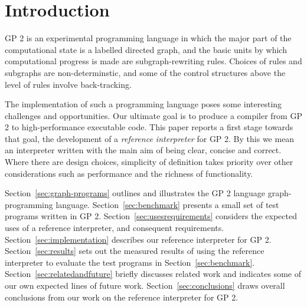 \section{Introduction}

GP 2 is an experimental programming language in which the major part of
the computational state is a labelled directed graph, and the basic
units by which computational progress is made are subgraph-rewriting
rules.
Choices of rules and subgraphs are non-determinstic, and some of
the control structures above the level of rules involve back-tracking.

The implementation of such a programming language poses some
interesting challenges and opportunities.
Our ultimate goal is to produce a compiler from GP 2 to
high-performance executable code.
This paper reports a first stage towards that goal, the development
of a \emph{reference interpreter} for GP 2.
By this we mean an interpreter written with the main aim of
being clear, concise and correct.
Where there are design choices, simplicity of
definition takes priority over other considerations
such as performance and the richness of functionality.

Section~\ref{sec:graph-programs} outlines and illustrates the GP 2 language
graph-programming language.
Section~\ref{sec:benchmark} presents a small set of test programs
written in GP 2.
Section~\ref{sec:usesrequirements} considers the expected uses of
a reference interpreter, and consequent requirements.
Section~\ref{sec:implementation} describes our reference interpreter for
GP 2.
Section~\ref{sec:results} sets out the measured results of using the reference
interpreter to evaluate the test programs in Section~\ref{sec:benchmark}.
Section~\ref{sec:relatedandfuture} briefly discusses related work and
indicates some of our own expected lines of future work.
Section~\ref{sec:conclusions} draws overall conclusions from our work
on the reference interpreter for GP 2.

